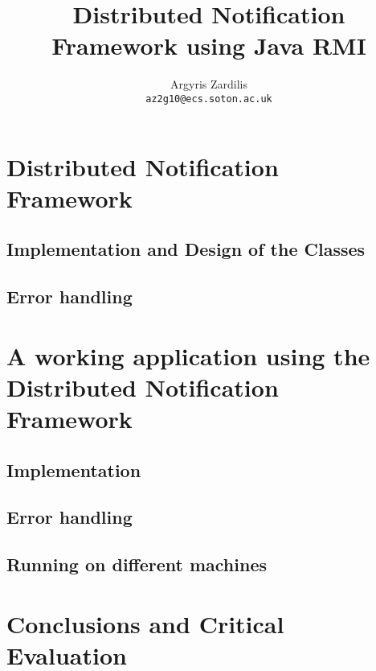 \documentclass[a4paper,11pt,titlepage]{report}
\author{Argyris Zardilis\\ \texttt{az2g10@ecs.soton.ac.uk}}
\title{Distributed Notification Framework using Java RMI}
\begin{document}
\maketitle
\section{Distributed Notification Framework}
\subsection{Implementation and Design of the Classes}
\subsection{Error handling}
\section{A working application using the Distributed Notification Framework}
\subsection{Implementation}
\subsection{Error handling}
\subsection{Running on different machines}
\section{Conclusions and Critical Evaluation}
\end{document}
